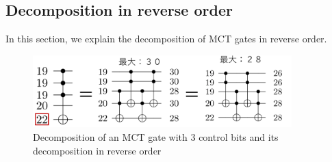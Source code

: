 \subsection{Decomposition in reverse order}
In this section, we explain the decomposition of MCT gates in reverse order.

\begin{figure}[tbp]

\centering

\includegraphics[width=10cm]{img/reverse_mct.pdf}

\caption{Decomposition of an MCT gate with 3 control bits and its decomposition in reverse order}

\label{reverse}

\end{figure}

